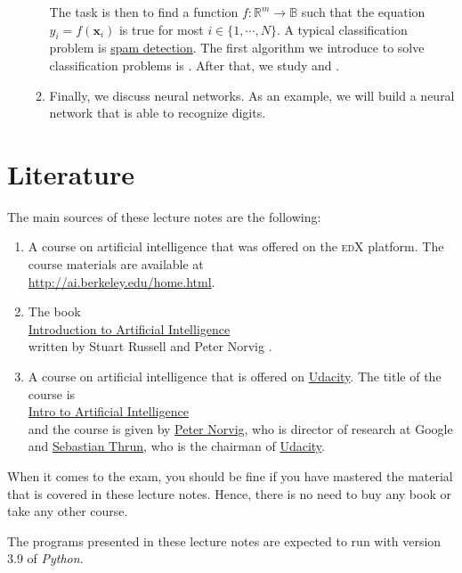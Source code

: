\begin{enumerate}
\begin{enumerate}
            The task is then to find a function $f:\mathbb{R}^m \rightarrow \mathbb{B}$
            such that the equation $y_i = f(\mathbf{x}_i)$ is true for most $i\in\{1,\cdots,N\}$.  A typical
            classification problem is \href{https://en.wikipedia.org/wiki/Email_spam}{spam detection}.  The
            first algorithm we introduce to solve classification problems is .
            After that, we study  and .
      \item Finally, we discuss neural networks.  As an example, we will build a neural network that is able to
            recognize digits. 
      \end{enumerate}
\end{enumerate}
\pagebreak

\section{Literature}
The main sources of these lecture notes are the following:
\begin{enumerate}
\item A course on artificial intelligence that was offered on the \textsc{edX} platform.  The course
      materials are available at  
      \\[0.2cm]
      \hspace*{1.3cm}
      \href{http://ai.berkeley.edu/home.html}{http://ai.berkeley.edu/home.html}.
\item The book
      \\[0.2cm]
      \hspace*{1.3cm}
      \href{http://www.google.com/search?q=introduction+to+Artificial+Intelligence+RusseLl+Norvig+pdf}{Introduction to Artificial Intelligence}
      \\[0.2cm]
      written by Stuart Russell and Peter Norvig \cite{russell:2009}.
\item A course on artificial intelligence that is offered on \href{https://www.udacity.com}{Udacity}.  The title of the
      course is
      \\[0.2cm]
      \hspace*{1.3cm}
      \href{https://www.udacity.com/course/intro-to-artificial-intelligence--cs271}{Intro to Artificial Intelligence}
      \\[0.2cm]
      and the course is given by \href{https://en.wikipedia.org/wiki/Peter_Norvig}{Peter Norvig}, who is
      director of research at Google and \href{https://en.wikipedia.org/wiki/Sebastian_Thrun}{Sebastian Thrun},
      who is the chairman of \href{https://www.udacity.com}{Udacity}.
\end{enumerate}
When it comes to the exam, you should be fine if you have mastered the material that is covered in these
lecture notes.  Hence, there is no need to buy any book or take any other course.

\remark
The programs presented in these lecture notes are expected to run with version 3.9 of \textsl{Python}.


